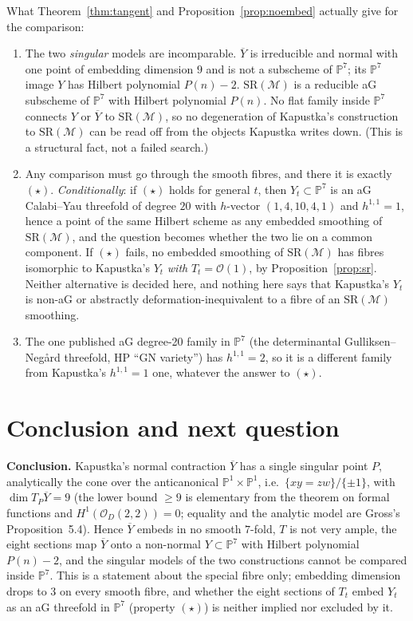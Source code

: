 \documentclass[10pt,a4paper]{article}
\theoremstyle{plain}
\theoremstyle{definition}
\theoremstyle{remark}
\begin{document}
\medskip
What Theorem~\ref{thm:tangent} and Proposition~\ref{prop:noembed}
actually give for the comparison:

\begin{enumerate}[label=(\roman*)]
\item The two \emph{singular} models are incomparable. $\overline{Y}$
is irreducible and normal with one point of embedding dimension
$9$ and is not a subscheme of $\mathbb{P}^7$; its $\mathbb{P}^7$
image $Y$ has Hilbert polynomial $P(n)-2$. $\mathrm{SR}(\mathcal{M})$
is a reducible aG subscheme of $\mathbb{P}^7$ with Hilbert
polynomial $P(n)$. No flat family inside $\mathbb{P}^7$ connects
$Y$ or $\overline{Y}$ to $\mathrm{SR}(\mathcal{M})$, so no
degeneration of Kapustka's construction to
$\mathrm{SR}(\mathcal{M})$ can be read off from the objects
Kapustka writes down. (This is a structural fact, not a failed
search.)
\item Any comparison must go through the smooth fibres, and there it
is exactly $(\star)$. \emph{Conditionally}: if $(\star)$ holds for
general $t$, then $Y_t\subset\mathbb{P}^7$ is an aG Calabi--Yau
threefold of degree $20$ with $h$-vector $(1,4,10,4,1)$ and
$h^{1,1}=1$, hence a point of the same Hilbert scheme as any
embedded smoothing of $\mathrm{SR}(\mathcal{M})$, and the question
becomes whether the two lie on a common component. If $(\star)$
fails, no embedded smoothing of $\mathrm{SR}(\mathcal{M})$ has
fibres isomorphic to Kapustka's $Y_t$ \emph{with}
$T_t=\mathcal{O}(1)$, by Proposition~\ref{prop:sr}. Neither
alternative is decided here, and nothing here says that
Kapustka's $Y_t$ is non-aG or abstractly deformation-inequivalent
to a fibre of an $\mathrm{SR}(\mathcal{M})$ smoothing.
\item The one published aG degree-20 family in $\mathbb{P}^7$ (the
determinantal Gulliksen--Neg\aa rd threefold, HP ``GN variety'') has
$h^{1,1}=2$, so it is a different family from Kapustka's
$h^{1,1}=1$ one, whatever the answer to $(\star)$.
\end{enumerate}

\section*{Conclusion and next question}

\noindent\textbf{Conclusion.} Kapustka's normal contraction
$\overline{Y}$ has a single singular point $P$, analytically the
cone over the anticanonical $\mathbb{P}^1\times\mathbb{P}^1$, i.e.\
$\{xy=zw\}/\{\pm1\}$, with $\dim T_P\overline{Y}=9$ (the lower bound
$\ge 9$ is elementary from the theorem on formal functions and
$H^1(\mathcal{O}_D(2,2))=0$; equality and the analytic model are
Gross's Proposition~5.4). Hence $\overline{Y}$ embeds in no smooth
$7$-fold, $T$ is not very ample, the eight sections map
$\overline{Y}$ onto a non-normal $Y\subset\mathbb{P}^7$ with
Hilbert polynomial $P(n)-2$, and the singular models of the two
constructions cannot be compared inside $\mathbb{P}^7$. This is a
statement about the special fibre only; embedding dimension drops
to $3$ on every smooth fibre, and whether the eight sections of
$T_t$ embed $Y_t$ as an aG threefold in $\mathbb{P}^7$ (property
$(\star)$) is neither implied nor excluded by it.
\end{document}

